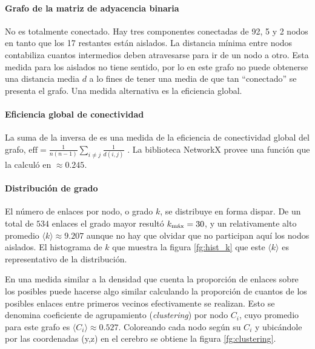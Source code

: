 \documentclass{article}
\begin{document}
\paragraph{Grafo de la matriz de adyacencia binaria}
No es totalmente conectado.
Hay tres componentes conectadas de 92, 5 y 2 nodos en tanto que los 17 restantes están aislados.
La distancia mínima entre nodos contabiliza cuantos intermedios deben atravesarse para ir de un nodo a otro.
Esta medida para los aislados no tiene sentido, por lo en este grafo no puede obtenerse una distancia media $d$ a lo fines de tener una media de que tan ``conectado'' se presenta el grafo.
Una medida alternativa es la eficiencia global.


\paragraph{Eficiencia global de conectividad}
La suma de la inversa de es una medida de la eficiencia de conectividad global del grafo, $\mathrm{eff} = \frac{1}{n (n-1)} \sum_{i \neq j} \frac{1}{d(i,j)}$ \cite{ek_global_2015}.
La biblioteca NetworkX provee una función que la calculó en $\approx 0.245$.


\paragraph{Distribución de grado}
El número de enlaces por nodo, o grado $k$, se distribuye en forma dispar.
De un total de $534$ enlaces el grado mayor resultó $k_\textnormal{máx} = 30$, y un relativamente alto promedio $\langle k \rangle \approx 9.207$ aunque no hay que olvidar que no participan aquí los nodos aislados.
El histograma de $k$ que muestra la figura \ref{fg:hist_k} que este $\langle k \rangle$ es representativo de la distribución.

En una medida similar a la densidad que cuenta la proporción de enlaces sobre los posibles puede hacerse algo similar calculando la proporción de cuantos de los posibles enlaces entre primeros vecinos efectivamente se realizan.
Esto se denomina coeficiente de agrupamiento (\emph{clustering}) por nodo $C_i$, cuyo promedio para este grafo es $\langle C_i \rangle \approx 0.527$. 
Coloreando cada nodo según su $C_i$ y ubicándole por las coordenadas (y,z) en el cerebro se obtiene la figura \ref{fg:clustering}. 
\end{document}
